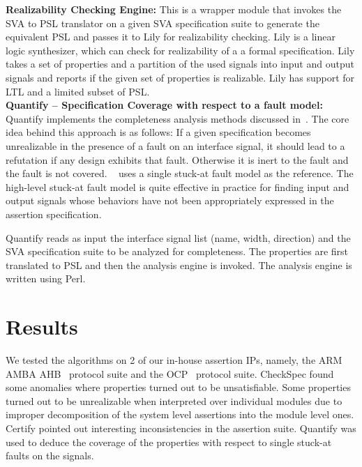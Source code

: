 \documentclass{svmult}
\begin{document}
\noindent
{\bf Realizability Checking Engine:}
This is a wrapper module that invokes the SVA to PSL translator on a given 
SVA specification suite to generate the equivalent PSL and passes it to 
Lily for realizability checking. 
Lily is a linear logic synthesizer, which can check for realizability of a 
a formal specification. Lily takes a set of 
properties and a partition of the used signals into input and 
output signals and reports if the given set of properties is realizable.
Lily has support for LTL and a limited subset of PSL. \\

\noindent
{\bf Quantify -- Specification Coverage with respect to a fault model:} 
Quantify implements the completeness analysis methods discussed 
in~\cite{das:05}. The core idea behind this approach is as follows: If a 
given specification becomes unrealizable in the presence of a 
fault on an interface signal, it should lead to a
refutation if any design exhibits that fault. Otherwise it is inert to the
fault and the fault is not covered. ~\cite{das:05} uses a single stuck-at 
fault model as the reference. The high-level stuck-at fault model is quite 
effective in practice for finding input and output signals whose behaviors 
have not been appropriately expressed in the assertion specification. 

Quantify reads as input the interface signal 
list (name, width, direction) and the SVA specification suite to be 
analyzed for completeness. The properties are first translated to 
PSL and then the analysis engine is invoked. 
The analysis engine is written using Perl.

\section{Results} \label{sec5}
We tested the algorithms on 2 of our in-house assertion IPs, namely, the ARM
AMBA AHB~\cite{ARM} protocol suite and the OCP~\cite{ocp} protocol suite. 
CheckSpec found some anomalies where properties turned out to be
unsatisfiable. Some properties turned out to be unrealizable when
interpreted over individual modules due to improper decomposition of 
the system level assertions into the module level ones. Certify 
pointed out interesting inconsistencies in the assertion suite.
Quantify was used to deduce the coverage of the properties with respect 
to single stuck-at faults on the signals. 
\end{document}
